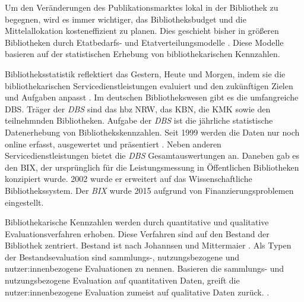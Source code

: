 Um den Veränderungen des Publikationsmarktes lokal in der Bibliothek zu begegnen, wird es immer wichtiger, das Bibliotheksbudget und die Mittelallokation kosteneffizient zu planen. 
Dies geschieht bisher in größeren Bibliotheken durch Etatbedarfs- und Etatverteilungsmodelle \cite[Vgl.][172 ff.]{moravetz-kuhlmann_monika_erwerbungspolitik_2015}.
Diese Modelle basieren auf der statistischen Erhebung von bibliothekarischen Kennzahlen.

Bibliotheksstatistik reflektiert das Gestern, Heute und Morgen, indem 
sie die bibliothekarischen Servicedienstleistungen evaluiert und den zukünftigen Zielen und Aufgaben anpasst \cites[Vgl.][2 f.]{jilovsky_cathie_library_2004}[Vgl.][462]{laitinen_markku_library_2013}.
Im deutschen Bibliothekswesen gibt es die umfangreiche \acrfull{DBS}. 
Träger der \textit{\acrshort{DBS}} sind das \acrfull{hbz NRW},  das \acrfull{KBN}, die \acrfull{KMK} sowie den teilnehmnden Bibliotheken.
Aufgabe der \textit{\acrshort{DBS}} ist die jährliche statistische Datenerhebung von Bibliothekskennzahlen. 
Seit 1999 werden die Daten nur noch online erfasst, ausgewertet und präsentiert \cite[Vgl.][2]{schmidt_deutsche_2008}.
Neben anderen Servicedienstleistungen bietet die \textit{\acrshort{DBS}} Gesamtauswertungen an.
Daneben gab es den \acrfull{BIX}, der ursprünglich für die Leistungsmessung in Öffentlichen Bibliotheken konzipiert wurde. 
2002 wurde er erweitert auf das Wissenschaftliche Bibliothekssystem. Der \textit{\acrshort{BIX}} wurde 2015 aufgrund von Finanzierungsproblemen eingestellt. 

Bibliothekarische Kennzahlen werden durch quantitative und qualitative Evaluationsverfahren erhoben. Diese Verfahren
sind auf den Bestand der Bibliothek zentriert. 
Bestand ist nach Johannsen und Mittermaier
 \cite[252]{johannsen_jochen_bestands-_2015}.
Als Typen der Bestandsevaluation sind sammlungs-, nutzungsbezogene und nutzer:innenbezogene Evaluationen zu nennen.\cite[Vgl.][302]{johnson_peggy_fundamentals_2014}
Basieren die sammlungs- und nutzungsbezogene Evaluation auf quantitativen Daten, greift die nutzer:innenbezogene Evaluation zumeist auf qualitative Daten zurück. 
\cite[Vgl.][461 ff.]{blake_data_2004}.

